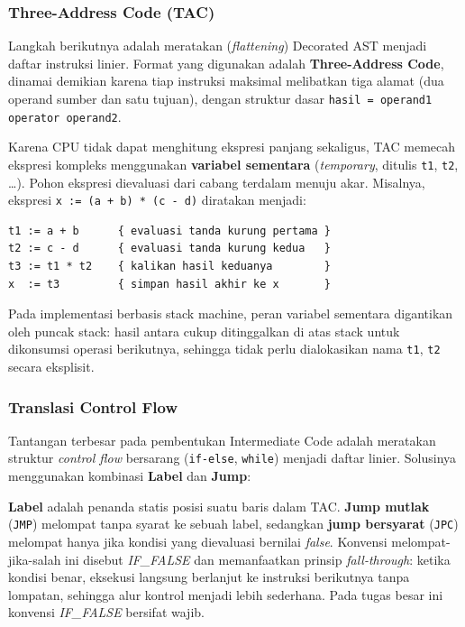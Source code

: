 \subsubsection{Three-Address Code (TAC)}

Langkah berikutnya adalah meratakan (\emph{flattening}) Decorated AST menjadi
daftar instruksi linier. Format yang digunakan adalah \textbf{Three-Address
Code}, dinamai demikian karena tiap instruksi maksimal melibatkan tiga alamat
(dua operand sumber dan satu tujuan), dengan struktur dasar
\texttt{hasil = operand1 operator operand2}.

Karena CPU tidak dapat menghitung ekspresi panjang sekaligus, TAC memecah ekspresi
kompleks menggunakan \textbf{variabel sementara} (\emph{temporary}, ditulis
\texttt{t1}, \texttt{t2}, \dots). Pohon ekspresi dievaluasi dari cabang terdalam
menuju akar. Misalnya, ekspresi \texttt{x := (a + b) * (c - d)} diratakan menjadi:

\begin{lstlisting}[style=kodeTAC]
t1 := a + b      { evaluasi tanda kurung pertama }
t2 := c - d      { evaluasi tanda kurung kedua   }
t3 := t1 * t2    { kalikan hasil keduanya        }
x  := t3         { simpan hasil akhir ke x       }
\end{lstlisting}

Pada implementasi berbasis stack machine, peran variabel sementara digantikan oleh
puncak stack: hasil antara cukup ditinggalkan di atas stack untuk dikonsumsi
operasi berikutnya, sehingga tidak perlu dialokasikan nama \texttt{t1}, \texttt{t2}
secara eksplisit.

\subsubsection{Translasi Control Flow}

Tantangan terbesar pada pembentukan Intermediate Code adalah meratakan struktur
\emph{control flow} bersarang (\texttt{if-else}, \texttt{while}) menjadi daftar
linier. Solusinya menggunakan kombinasi \textbf{Label} dan \textbf{Jump}:

\textbf{Label} adalah penanda statis posisi suatu baris dalam TAC.
\textbf{Jump mutlak} (\texttt{JMP}) melompat tanpa syarat ke sebuah label,
sedangkan \textbf{jump bersyarat} (\texttt{JPC}) melompat hanya jika kondisi yang
dievaluasi bernilai \emph{false}. Konvensi melompat-jika-salah ini disebut
\emph{IF\_FALSE} dan memanfaatkan prinsip \emph{fall-through}: ketika kondisi
benar, eksekusi langsung berlanjut ke instruksi berikutnya tanpa lompatan,
sehingga alur kontrol menjadi lebih sederhana. Pada tugas besar ini konvensi
\emph{IF\_FALSE} bersifat wajib.

